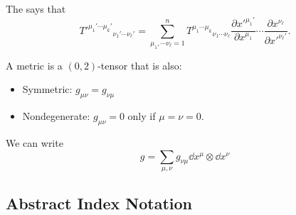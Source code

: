\documentclass{article}
\numberwithin{equation}{section}
\begin{document}
\begin{theorem}
    The  says that 
    \begin{equation*}
        T'^{\mu_1'\cdots \mu_k'}{}_{\nu_1'\cdots \nu_\ell'} = \sum_{\mu_1,\cdots \nu_\ell =1}^{n} T^{\mu_1 \cdots \mu_k}{}_{\nu_1 \cdots \nu_\ell}\frac{\partial x'^{\mu_1'}}{\partial x^{\mu_1}}\cdots\frac{\partial x^{\nu_\ell}}{\partial x'^{\nu_\ell'}}.
    \end{equation*}
\end{theorem}
\begin{definition}
    A metric is a $(0,2)$-tensor that is also:
    \begin{itemize}
        \item Symmetric: $g_{\mu\nu} = g_{\nu\mu}$
        \item Nondegenerate: $g_{\mu\nu} = 0$ only if $\mu=\nu=0.$
    \end{itemize}
\end{definition}
We can write
\begin{equation*}
    g = \sum_{\mu,\nu} g_{\nu\mu} \dd{x}^\mu \otimes \dd{x}^\nu
\end{equation*}
\subsection{Abstract Index Notation}
\end{document}
